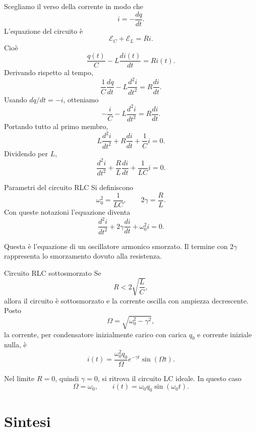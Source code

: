 \documentclass[a4paper]{article}
\begin{document}
Scegliamo il verso della corrente in modo che
\[
i=-\frac{dq}{dt}.
\]
L'equazione del circuito è
\[
\mathcal{E}_C+\mathcal{E}_L=Ri.
\]
Cioè
\[
\frac{q(t)}{C}-L\frac{di(t)}{dt}=Ri(t).
\]
Derivando rispetto al tempo,
\[
\frac{1}{C}\frac{dq}{dt}-L\frac{d^2i}{dt^2}=R\frac{di}{dt}.
\]
Usando \(dq/dt=-i\), otteniamo
\[
-\frac{i}{C}-L\frac{d^2i}{dt^2}=R\frac{di}{dt}.
\]
Portando tutto al primo membro,
\[
L\frac{d^2i}{dt^2}+R\frac{di}{dt}+\frac{1}{C}i=0.
\]
Dividendo per \(L\),
\[
\frac{d^2i}{dt^2}+\frac{R}{L}\frac{di}{dt}+\frac{1}{LC}i=0.
\]

\begin{snippetdefinition}{Parametri del circuito RLC}
Si definiscono
\[
    \omega_0^2=\frac{1}{LC},
    \qquad
    2\gamma=\frac{R}{L}.
\]
Con queste notazioni l'equazione diventa
\[
    \frac{d^2i}{dt^2}+2\gamma\frac{di}{dt}+\omega_0^2i=0.
\]
\end{snippetdefinition}

Questa è l'equazione di un oscillatore armonico smorzato. Il termine con \(2\gamma\) rappresenta lo smorzamento dovuto alla resistenza.

\begin{snippettheorem}{Circuito RLC sottosmorzato}
Se
\[
    R<2\sqrt{\frac{L}{C}},
\]
allora il circuito è sottosmorzato e la corrente oscilla con ampiezza decrescente. Posto
\[
    \Omega=\sqrt{\omega_0^2-\gamma^2},
\]
la corrente, per condensatore inizialmente carico con carica \(q_0\) e corrente iniziale nulla, è
\[
    i(t)=\frac{\omega_0^2q_0}{\Omega}e^{-\gamma t}\sin(\Omega t).
\]
\end{snippettheorem}

\begin{center}
\end{center}

Nel limite \(R=0\), quindi \(\gamma=0\), si ritrova il circuito LC ideale. In questo caso
\[
\Omega=\omega_0,
\qquad
i(t)=\omega_0q_0\sin(\omega_0t).
\]

\section{Sintesi}
\end{document}
